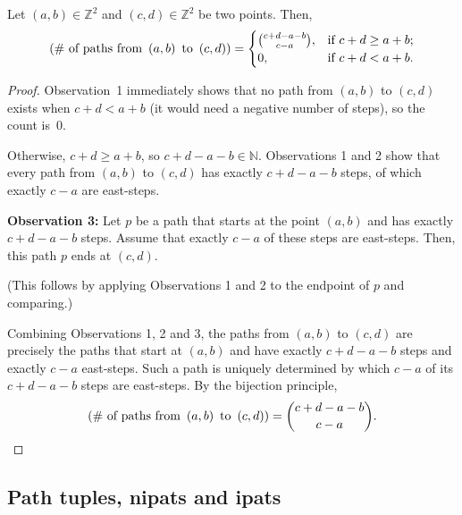 \begin{proposition}
\label{prop.lgv.1-paths.ct}
\leantarget
\leanok
Let $\left(  a,b\right)  \in\mathbb{Z}^{2}$ and
$\left(  c,d\right)  \in\mathbb{Z}^{2}$ be two points. Then,
\[
\left(  \text{\# of paths from }\left(  a,b\right)  \text{ to }\left(
c,d\right)  \right)  =%
\begin{cases}
\dbinom{c+d-a-b}{c-a}, & \text{if }c+d\geq a+b;\\
0, & \text{if }c+d<a+b.
\end{cases}
\]
\end{proposition}

\begin{proof}
Observation~1 immediately shows that no path from $(a,b)$ to $(c,d)$
exists when $c+d < a+b$ (it would need a negative number of steps),
so the count is~$0$.

Otherwise, $c + d \ge a + b$, so $c+d-a-b \in \mathbb{N}$.
Observations 1 and 2 show that every path from $(a,b)$ to $(c,d)$
has exactly $c + d - a - b$ steps, of which exactly $c - a$ are
east-steps.

\textbf{Observation 3:} Let $p$ be a path that starts at the point $(a,b)$
and has exactly $c+d-a-b$ steps. Assume that exactly $c-a$ of these
steps are east-steps. Then, this path $p$ ends at $(c,d)$.

(This follows by applying Observations 1 and 2 to the endpoint of $p$
and comparing.)

Combining Observations 1, 2 and 3, the paths from $(a,b)$ to $(c,d)$
are precisely the paths that start at $(a,b)$ and have exactly
$c+d-a-b$ steps and exactly $c-a$ east-steps. Such a path is
uniquely determined by which $c-a$ of its $c+d-a-b$ steps are
east-steps. By the bijection principle,
\[
  \left(  \text{\# of paths from }\left(  a,b\right)  \text{ to }\left(
  c,d\right)  \right)
  = \dbinom{c+d-a-b}{c-a}.
\]
\end{proof}

\subsection{Path tuples, nipats and ipats}

